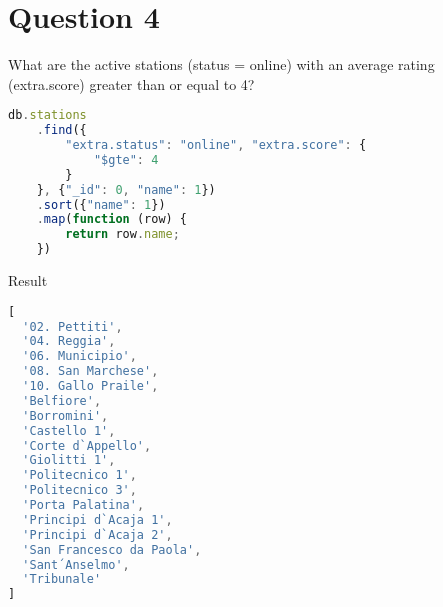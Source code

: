 \section{Question 4}

\begin{question}
  What are the active stations (status = online) with an average rating
  (extra.score) greater than or equal
  to 4?
\end{question}

\begin{answer}

  \begin{lstlisting}[language=js]
db.stations
    .find({
        "extra.status": "online", "extra.score": {
            "$gte": 4
        }
    }, {"_id": 0, "name": 1})
    .sort({"name": 1})
    .map(function (row) {
        return row.name;
    })
  \end{lstlisting}
  \pagebreak
  Result
  \begin{lstlisting}[language=js]
    [
  '02. Pettiti',
  '04. Reggia',
  '06. Municipio',
  '08. San Marchese',
  '10. Gallo Praile',
  'Belfiore',
  'Borromini',
  'Castello 1',
  'Corte d`Appello',
  'Giolitti 1',
  'Politecnico 1',
  'Politecnico 3',
  'Porta Palatina',
  'Principi d`Acaja 1',
  'Principi d`Acaja 2',
  'San Francesco da Paola',
  'Sant´Anselmo',
  'Tribunale'
]
  \end{lstlisting}

\end{answer}
